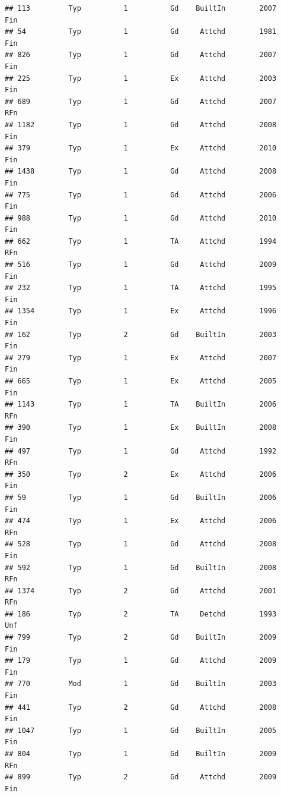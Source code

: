 \documentclass[]{article}
\begin{document}
\begin{verbatim}
## 113         Typ          1          Gd    BuiltIn        2007          Fin
## 54          Typ          1          Gd     Attchd        1981          Fin
## 826         Typ          1          Gd     Attchd        2007          Fin
## 225         Typ          1          Ex     Attchd        2003          Fin
## 689         Typ          1          Gd     Attchd        2007          RFn
## 1182        Typ          1          Gd     Attchd        2008          Fin
## 379         Typ          1          Ex     Attchd        2010          Fin
## 1438        Typ          1          Gd     Attchd        2008          Fin
## 775         Typ          1          Gd     Attchd        2006          Fin
## 988         Typ          1          Gd     Attchd        2010          Fin
## 662         Typ          1          TA     Attchd        1994          RFn
## 516         Typ          1          Gd     Attchd        2009          Fin
## 232         Typ          1          TA     Attchd        1995          Fin
## 1354        Typ          1          Ex     Attchd        1996          Fin
## 162         Typ          2          Gd    BuiltIn        2003          Fin
## 279         Typ          1          Ex     Attchd        2007          Fin
## 665         Typ          1          Ex     Attchd        2005          Fin
## 1143        Typ          1          TA    BuiltIn        2006          RFn
## 390         Typ          1          Ex    BuiltIn        2008          Fin
## 497         Typ          1          Gd     Attchd        1992          RFn
## 350         Typ          2          Ex     Attchd        2006          Fin
## 59          Typ          1          Gd    BuiltIn        2006          Fin
## 474         Typ          1          Ex     Attchd        2006          RFn
## 528         Typ          1          Gd     Attchd        2008          Fin
## 592         Typ          1          Gd    BuiltIn        2008          RFn
## 1374        Typ          2          Gd     Attchd        2001          RFn
## 186         Typ          2          TA     Detchd        1993          Unf
## 799         Typ          2          Gd    BuiltIn        2009          Fin
## 179         Typ          1          Gd     Attchd        2009          Fin
## 770         Mod          1          Gd    BuiltIn        2003          Fin
## 441         Typ          2          Gd     Attchd        2008          Fin
## 1047        Typ          1          Gd    BuiltIn        2005          Fin
## 804         Typ          1          Gd    BuiltIn        2009          RFn
## 899         Typ          2          Gd     Attchd        2009          Fin

\end{verbatim}
\end{document}
